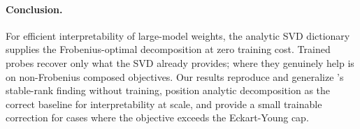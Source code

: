 \paragraph{Conclusion.} For efficient interpretability of large-model weights, the analytic SVD dictionary supplies the Frobenius-optimal decomposition at zero training cost. Trained probes recover only what the SVD already provides; where they genuinely help is on non-Frobenius composed objectives. Our results reproduce and generalize \bsf's stable-rank finding without training, position analytic decomposition as the correct baseline for interpretability at scale, and provide a small trainable correction for cases where the objective exceeds the Eckart-Young cap.
